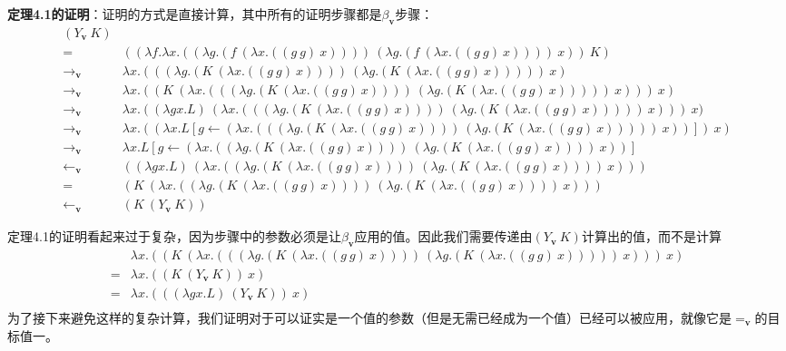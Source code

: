 \documentclass{book}
\begin{document}
\begin{adjustwidth}{20pt}{20pt}
\textbf{定理4.1的证明}：证明的方式是直接计算，其中所有的证明步骤都是$\beta_{\mathbf{v}}$步骤：
 $$
 \begin{array}{ll}
  (Y_{\mathbf{v}}\ K) & \\
  = & ((\lambda f.\lambda x.((\lambda g.(f\ (\lambda x.((g\ g)\ x))))\ (\lambda g.(f\ (\lambda x.((g\ g)\ x))))\ x))\ K)\\
  \rightarrow_{\mathbf{v}} & \lambda x.(((\lambda g.(K\ (\lambda x.((g\ g)\ x))))\ (\lambda g.(K\ (\lambda x.((g\ g)\ x)))))\ x)\\
  \rightarrow_{\mathbf{v}} & \lambda x.((K\ (\lambda x.(((\lambda g.(K\ (\lambda x.((g\ g)\ x))))\ (\lambda g.(K\ (\lambda x.((g\ g)\ x)))))\ x)))\ x)\\
  \rightarrow_{\mathbf{v}} & \lambda x.((\lambda gx.L)\ (\lambda x.(((\lambda g.(K\ (\lambda x.((g\ g)\ x))))\ (\lambda g.(K\ (\lambda x.((g\ g)\ x)))))\ x)))\ x)\\
  \rightarrow_{\mathbf{v}} & \lambda x.((\lambda x.L[g\leftarrow(\lambda x.(((\lambda g.(K\ (\lambda x.((g\ g)\ x))))\ (\lambda g.(K\ (\lambda x.((g\ g)\ x)))))\ x))])\ x)\\
  \rightarrow_{\mathbf{v}} & \lambda x.L[g\leftarrow(\lambda x.((\lambda g.(K\ (\lambda x.((g\ g)\ x))))\ (\lambda g.(K\ (\lambda x.((g\ g)\ x))))\ x))]\\
  \leftarrow_{\mathbf{v}} & ((\lambda gx.L)\ (\lambda x.((\lambda g.(K\ (\lambda x.((g\ g)\ x))))\ (\lambda g.(K\ (\lambda x.((g\ g)\ x))))\ x)))\\
  = & (K\ (\lambda x.((\lambda g.(K\ (\lambda x.((g\ g)\ x))))\ (\lambda g.(K\ (\lambda x.((g\ g)\ x))))\ x)))\\
  \leftarrow_{\mathbf{v}} & (K\ (Y_{\mathbf{v}}\ K))
 \end{array}
 $$
\end{adjustwidth}
定理4.1的证明看起来过于复杂，因为步骤中的参数必须是让$\beta_{\mathbf{v}}$应用的值。因此我们需要传递由$(Y_{\mathbf{v}}\ K)$计算出的值，而不是计算
$$
\begin{array}{ll}
 & \lambda x.((K\ (\lambda x.(((\lambda g.(K\ (\lambda x.((g\ g)\ x))))\ (\lambda g.(K\ (\lambda x.((g\ g)\ x)))))\ x)))\ x)\\
 = & \lambda x.((K\ (Y_{\mathbf{v}}\ K))\ x)\\
 = & \lambda x.(((\lambda gx.L)\ (Y_{\mathbf{v}}\ K))\ x)\\
\end{array}
$$
为了接下来避免这样的复杂计算，我们证明对于可以证实是一个值的参数（但是无需已经成为一个值）已经可以被应用，就像它是$=_{\mathbf{v}}$的目标值一。
\end{document}
